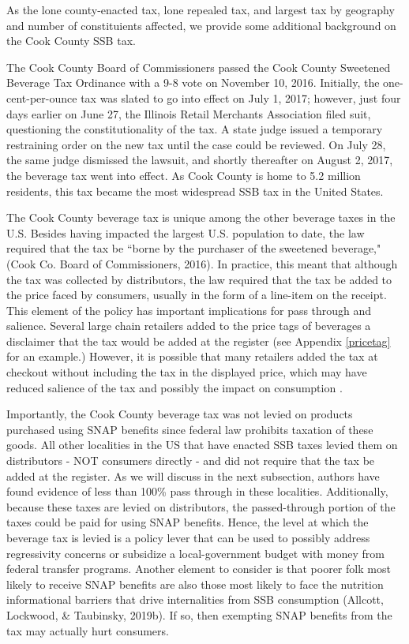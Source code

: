 \documentclass[12pt]{article}
\begin{document}
As the lone county-enacted tax, lone repealed tax, and largest tax by geography and number of constituients affected, we provide some additional background on the Cook County SSB tax.

The Cook County Board of Commissioners passed the Cook County Sweetened Beverage Tax Ordinance with a 9-8 vote on November 10, 2016. Initially, the one-cent-per-ounce tax was slated to go into effect on July 1, 2017; however, just four days earlier on June 27, the Illinois Retail Merchants Association filed suit, questioning the constitutionality of the tax. A state judge issued a temporary restraining order on the new tax until the case could be reviewed. On July 28, the same judge dismissed the lawsuit, and shortly thereafter on August 2, 2017, the beverage tax went into effect. As Cook County is home to 5.2 million residents, this tax became the most widespread SSB tax in the United States.

The Cook County beverage tax is unique among the other beverage taxes in the U.S. Besides having impacted the largest U.S. population to date, the law required that the tax be ``borne by the purchaser of the sweetened beverage," (Cook Co. Board of Commissioners, 2016). In practice, this meant that although the tax was collected by distributors, the law required that the tax be added to the price faced by consumers, usually in the form of a line-item on the receipt. This element of the policy has important implications for pass through and salience. Several large chain retailers added to the price tags of beverages a disclaimer that the tax would be added at the register (see Appendix \ref{pricetag} for an example.) However, it is possible that many retailers added the tax at checkout without including the tax in the displayed price, which may have reduced salience of the tax and possibly the impact on consumption \parencite{chetty2009salience}.

Importantly, the Cook County beverage tax was not levied on products purchased using SNAP benefits since federal law prohibits taxation of these goods. All other localities in the US that have enacted SSB taxes levied them on distributors - NOT consumers directly - and did not require that the tax be added at the register. As we will discuss in the next subsection, authors have found evidence of less than 100\% pass through in these localities. Additionally, because these taxes are levied on distributors, the passed-through portion of the taxes could be paid for using SNAP benefits. Hence, the level at which the beverage tax is levied is a policy lever that can be used to possibly address regressivity concerns or subsidize a local-government budget with money from federal transfer programs. Another element to consider is that poorer folk most likely to receive SNAP benefits are also those most likely to face the nutrition informational barriers that drive internalities from SSB consumption (Allcott, Lockwood, \& Taubinsky, 2019b). If so, then exempting SNAP benefits from the tax may actually hurt consumers.
\end{document}
